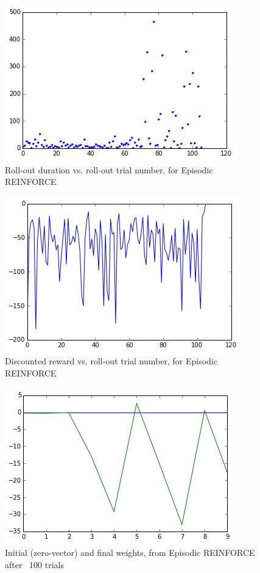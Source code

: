 \documentclass{article}
\begin{document}
\begin{figure}
\centering
\includegraphics[scale=0.5]{figures/policySearch_zeroVector_duration.png}
\caption{Roll-out duration vs. roll-out trial number, for Episodic REINFORCE}
\label{figures/policySearch_zeroVector_duration.png}
\end{figure}


\begin{figure}
\centering
\includegraphics[scale=0.5]{figures/policySearch_zeroVector_discR.png}
\caption{Discounted reward vs. roll-out trial number, for Episodic REINFORCE}
\label{figures/policySearch_zeroVector_discR.png}
\end{figure}

\begin{figure}
\centering
\includegraphics[scale=0.5]{figures/policySearch_zeroVector_weights.png}
\caption{Initial (zero-vector) and final weights, from Episodic REINFORCE after ~100 trials}
\label{figures/policySearch_zeroVector_weights.png}
\end{figure}







\end{document}
